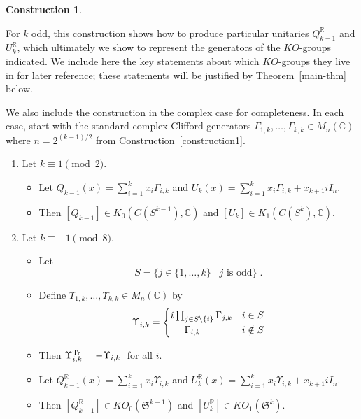 \documentclass[12pt, reqno]{amsart}
\theoremstyle{definition}
\newtheorem{const}[thm]{Construction}
\def\R{{\mathbb R}}
\def\C{{\mathbb C}}
\def\T{{\mathbb T}}
\def\Up{{\Upsilon}}
\def\pr{^{\scriptscriptstyle \R}}
\def\T{ ^{\rm{Tr}}}
\newcommand{\fS}{\mathfrak S}
\begin{document}
\begin{const} ~ \label{construction}

For $k$ odd, this construction shows how to produce particular unitaries $Q_{k-1}\pr$ and $U_k\pr$, which ultimately we show to represent the generators of the $KO$-groups indicated. We include here the key statements about which $KO$-groups they live in for later reference;  these statements will be justified by Theorem~\ref{main-thm} below.

We also include the construction in the complex case for completeness. In each case, start with the standard complex Clifford generators $\Gamma_{1,k}, \dots, \Gamma_{k,k} \in M_n(\C)$ where $n = 2^{(k-1)/2}$ from Construction~\ref{construction1}.

\begin{enumerate}
\item[(0)] Let $k \equiv 1 \pmod 2$.
\begin{itemize} 
\item Let $Q_{k-1}(x) = \sum_{i = 1}^k x_i \Gamma_{i,k}$ and $U_k(x) = \sum_{i = 1}^k x_i \Gamma_{i,k} + x_{k+1} i I_n$.
\item Then $[Q_{k-1}] \in K_{0}(C(S^{k-1}), \C)$ and $[U_k] \in K_{1}(C(S^k), \C)$.
\end{itemize}

\vspace{.5cm}

\item[(1)] Let $k \equiv -1 \pmod 8$.
\begin{itemize}
\item Let $$  S=  \{j \in  \{1, \dots, k\} \mid \text{$j$ is odd} \} \; .$$
\item Define $\Up_{1,k}, \dots, \Up_{k,k} \in M_n(\C)$ by
$$\Up_{i,k} =
	\begin{cases} 
			 i \prod_{ j \in S \backslash \{i\}} \Gamma_{j,k} & i \in S \\ \hspace{.5cm} \Gamma_{i,k} & i \notin S 
	\end{cases} $$
\item Then $\Up\T_{i,k} =  - \Up_{i,k} \; $ for all $i$.
\item Let $Q\pr_{k-1}(x) = \sum_{i = 1}^k x_i \Up_{i,k}$ and $U\pr_k(x) = \sum_{i = 1}^k x_i \Up_{i,k} + x_{k+1} i I_n$.
\item Then $[Q\pr_{k-1}] \in KO_{0}(\fS^{k-1})$ and $[U\pr_k] \in KO_{1}(\fS^{k})$.
\end{itemize}

\vspace{.5cm}


\end{enumerate}
\end{const}
\end{document}
